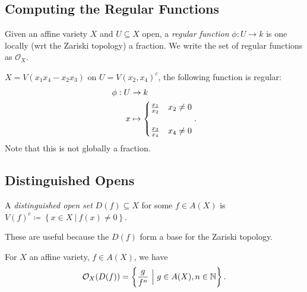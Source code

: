 \hypertarget{computing-the-regular-functions}{%
\subsection{Computing the Regular
Functions}\label{computing-the-regular-functions}}

Given an affine variety \(X\) and \(U\subseteq X\) open, a \emph{regular
function} \(\phi: U\to k\) is one locally (wrt the Zariski topology) a
fraction. We write the set of regular functions as \({\mathcal{O}}_X\).

\begin{example}

\(X = V(x_1 x_4 - x_2 x_3)\) on \(U = V(x_2, x_4)^c\), the following
function is regular:
\begin{align*}  
\phi: U &\to k \\
x &\mapsto 
\begin{cases}
{x_1\over x_2} & x_2 \neq 0 \\ \\
{x_3 \over x_4} & x_4 \neq 0
\end{cases}
.\end{align*}
Note that this is not globally a fraction.

\end{example}

\hypertarget{distinguished-opens}{%
\subsection{Distinguished Opens}\label{distinguished-opens}}

\begin{definition}

A \emph{distinguished open set} \(D(f) \subseteq X\) for some
\(f\in A(X)\) is
\(V(f)^c \coloneqq\left\{{x\in X {~\mathrel{\Big|}~}f(x) \neq 0}\right\}\).

\end{definition}

These are useful because the \(D(f)\) form a base for the Zariski
topology.

\begin{proposition}[?]

For \(X\) an affine variety, \(f\in A(X)\), we have
\begin{align*} 
{\mathcal{O}}_X(D(f)) = \left\{{ {g\over f^n} {~\mathrel{\Big|}~}g\in A(X), n\in {\mathbb{N}}}\right\}
.\end{align*}

\end{proposition}

